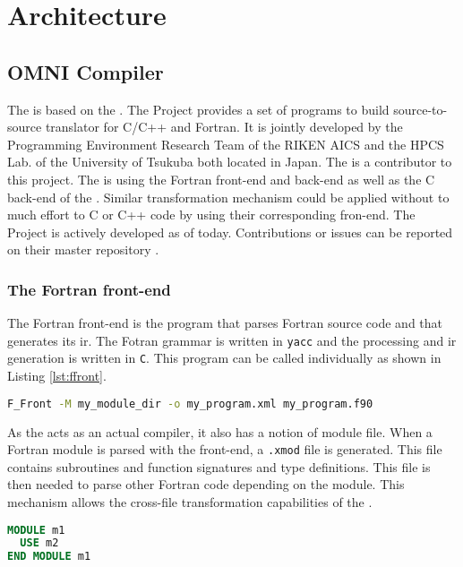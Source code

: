 \chapter{Architecture}
\section{OMNI Compiler}
The \clawfcomp is based on the \omni\cite{omni:website}. The \omni Project
provides a set of programs to build source-to-source translator for C/C++
and Fortran. It is jointly developed by the Programming Environment Research
Team of the RIKEN AICS and the HPCS Lab. of the University of Tsukuba both
located in Japan. The \clawfcomp is a contributor to this project.
The \clawfcomp is using the Fortran front-end and back-end as well as the
C back-end of the \omni. Similar transformation mechanism could be
applied without to much effort to C or C++ code by using their corresponding
fron-end. The \omni Project is actively developed as of today. Contributions or
issues can be reported on their master repository \cite{omni:github}.

\subsection{The Fortran front-end}
The Fortran front-end is the program that parses Fortran source code and that
generates its \gls{ir}. The Fotran grammar is written in \lstinline|yacc| and
the processing and \gls{ir} generation is written in \lstinline|C|. This program
can be called individually as shown in Listing \ref{lst:ffront}.

\begin{lstlisting}[label=lst:ffront, language=Bash, caption=Call F\_Front]
F_Front -M my_module_dir -o my_program.xml my_program.f90
\end{lstlisting}

As the \omni acts as an actual compiler, it also has a notion of module file.
When a Fortran module is parsed with the front-end, a \lstinline|.xmod| file is
generated. This file contains subroutines and function signatures and
type definitions. This file is then needed to parse other Fortran code depending
on the module. This mechanism allows the cross-file transformation capabilities
of the \clawfcomp.

\begin{lstlisting}[label=lst:m1, language=Fortran, caption=module\_m1.f90]
MODULE m1
  USE m2
END MODULE m1
\end{lstlisting}

